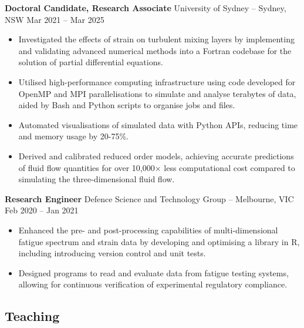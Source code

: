 \documentclass[11pt]{article}       %
\begin{document}
\textbf{Doctoral Candidate, Research Associate} {University of Sydney} -- Sydney, NSW \hfill Mar 2021 -- Mar 2025 \\
\vspace{-9pt}
\begin{itemize}
    \item Investigated the effects of strain on turbulent mixing layers by implementing and validating advanced numerical methods into a Fortran codebase for the solution of partial differential equations. 
    \item Utilised high-performance computing infrastructure using code developed for OpenMP and MPI parallelisations to simulate and analyse terabytes of data, aided by Bash and Python scripts to organise jobs and files.
    \item Automated visualisations of simulated data with Python APIs, reducing time and memory usage by 20-75\%.
    \item Derived and calibrated reduced order models, achieving accurate predictions of fluid flow quantities for over 10,000$\times$ less computational cost compared to simulating the three-dimensional fluid flow.
\end{itemize}

\textbf{Research Engineer} {Defence Science and Technology Group} -- Melbourne, VIC \hfill Feb 2020 -- Jan 2021 \\
\vspace{-9pt}
\begin{itemize}
  \item Enhanced the pre- and post-processing capabilities of multi-dimensional fatigue spectrum and strain data by developing and optimising a library in R, including introducing version control and unit tests.
  \item Designed programs to read and evaluate data from fatigue testing systems, allowing for continuous verification of experimental regulatory compliance.
\end{itemize}
\vspace{-16pt}
\subsection*{Teaching}
\vspace{-6pt}
\end{document}
